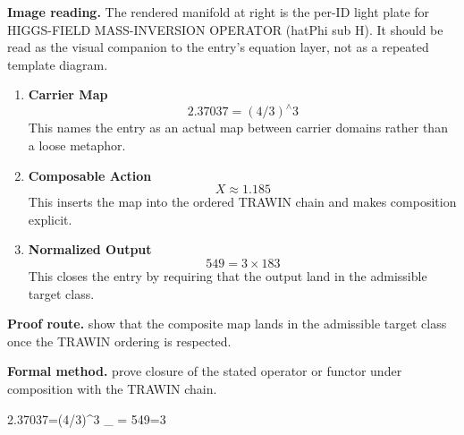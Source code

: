 \begin{samepage}
\noindent\begin{minipage}[t]{0.45\linewidth}
\vspace{0pt}
\raggedright
\scriptsize\textbf{Image reading.} The rendered manifold at right is the per-ID light plate for HIGGS-FIELD MASS-INVERSION OPERATOR (hatPhi sub H). It should be read as the visual companion to the entry's equation layer, not as a repeated template diagram.\par
\end{minipage}\hfill
\begin{minipage}[t]{0.53\linewidth}
\vspace*{-0.10in}
\raggedright
{}
\end{minipage}
\end{samepage}

\clearpage


\begin{enumerate}[leftmargin=1.6em,itemsep=9pt,topsep=6pt]
\item \textbf{Carrier Map}
\[
2.37037=(4/3)^{\wedge}3
\]
This names the entry as an actual map between carrier domains rather than a loose metaphor.

\item \textbf{Composable Action}
\[
X\approx1.185
\]
This inserts the map into the ordered TRAWIN chain and makes composition explicit.

\item \textbf{Normalized Output}
\[
549=3\times183
\]
This closes the entry by requiring that the output land in the admissible target class.
\end{enumerate}

\textbf{Proof route.} show that the composite map lands in the admissible target class once the TRAWIN ordering is respected.

\textbf{Formal method.} prove closure of the stated operator or functor under composition with the TRAWIN chain.

\medskip
{}

\begin{tzpsnapshot}
\end{tzpsnapshot}

\tzpequationlinks
  {2.37037=(4/3)^{\wedge}3}
  {_{} = \cdots}
  {549=3}
